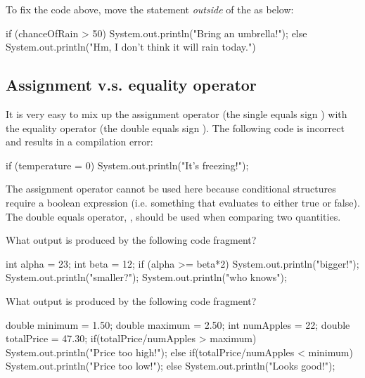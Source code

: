 \noindent To fix the code above, move the  statement \emph{outside} of the  as below:

\begin{code}
if (chanceOfRain > 50) {
    System.out.println("Bring an umbrella!");
} else {
    System.out.println("Hm, I don't think it will rain today.")
}
\end{code}

\subsection{Assignment v.s. equality operator}
It is very easy to mix up the assignment operator (the single equals sign \ic{=}) with the equality operator (the double equals sign \ic{==}). The following code is incorrect and results in a compilation error:

\begin{code}
if (temperature = 0) {
    System.out.println("It's freezing!");
}
\end{code}

\noindent The assignment operator cannot be used here because conditional structures require a boolean expression (i.e. something that evaluates to either true or false). The double equals operator, \ic{==}, should be used when comparing two quantities.

\exercisesection

\begin{exercise}
What output is produced by the following code fragment?

\begin{code}
int alpha = 23;
int beta = 12;
if (alpha >= beta*2)
    System.out.println("bigger!");
    System.out.println("smaller?");
System.out.println("who knows");
\end{code}
\end{exercise}

\begin{exercise}
What output is produced by the following code fragment?

\begin{code}
double minimum = 1.50;
double maximum = 2.50;
int numApples = 22;
double totalPrice = 47.30;
if(totalPrice/numApples > maximum)
    System.out.println("Price too high!");
else if(totalPrice/numApples < minimum)
    System.out.println("Price too low!");
else
    System.out.println("Looks good!");
\end{code}
\end{exercise}



